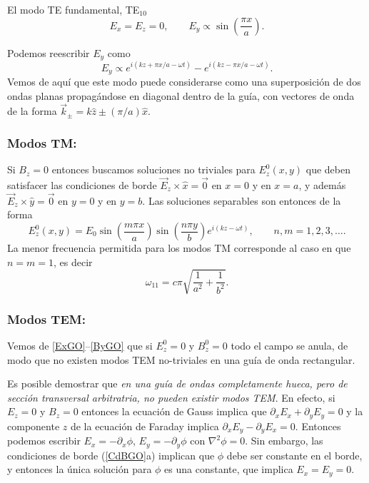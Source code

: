 El modo TE fundamental, TE$_{10}$
\begin{equation}
E_x=E_z=0, \qquad E_y \propto \sin\left(\frac{\pi x}{a}\right) .
\end{equation}

Podemos reescribir $E_y$ como
\begin{equation}
E_y\propto e^{i(kz+\pi x/a-\omega t)}-e^{i(kz-\pi x/a-\omega t)}.
\end{equation}
Vemos de aquí que este modo puede considerarse como una superposición de dos ondas planas propagándose en diagonal dentro de la guía, con vectores de onda de la forma $\vec{k}_\pm = k\hat{z}\pm(\pi /a)\hat{x}$. 


\subsubsection{Modos TM:}  Si $B_z=0$ entonces buscamos soluciones no triviales para $E^0_z(x,y)$ que deben satisfacer las condiciones de borde $\vec{E}_z\times\hat{x}=\vec{0}$ en $x=0$ y en $x=a$,   y además $\vec{E}_z\times\hat{y}=\vec{0}$ en $y=0$ y en $y=b$. Las soluciones separables son entonces de la forma
\begin{equation}
E^0_z(x, y) = E_0 \sin\left(\frac{m \pi x}{a}\right) \sin\left(\frac{n \pi y}{b}\right)e^{i(kz-\omega t)}, \qquad n,m=1,2,3,\dots.
\end{equation}
La menor frecuencia permitida para los modos TM corresponde al caso en que $n=m=1$, es decir
\begin{equation}
\omega_{11}=c\pi\sqrt{\frac{1}{a^2}+\frac{1}{b^2}}.
\end{equation}

\subsubsection{Modos TEM:} 

Vemos de \eqref{ExGO}--\eqref{ByGO} que si $E^0_z=0$ y $B^0_z=0$ todo el campo se anula, de modo que no existen modos TEM no-triviales en una guía de onda rectangular.

Es posible demostrar que \textit{en una guía de ondas completamente hueca, pero de sección transversal arbitratria, no pueden existir modos TEM}. En efecto, si $E_z=0$ y $B_z= 0$ entonces la ecuación de Gauss implica que $\partial_xE_x+\partial_yE_y=0$ y la componente $z$ de la ecuación de Faraday implica $\partial_xE_y-\partial_yE_x=0$. Entonces podemos escribir $E_x=-\partial_x\phi$, $E_y=-\partial_y\phi$ con $\nabla^2\phi=0$. Sin embargo, las condiciones de borde (\ref{CdBGO}a) implican que $\phi$ debe ser constante en el borde, y entonces la única solución para $\phi$ es una constante, que implica $E_x=E_y=0$.

